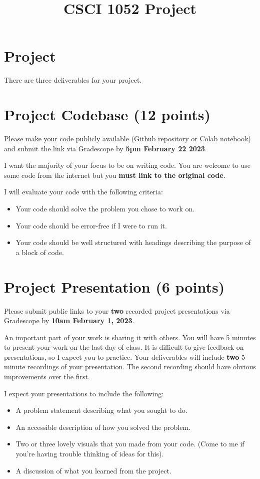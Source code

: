 \documentclass{article}
\title{CSCI 1052 Project}
\date{}
\begin{document}
\maketitle

\section*{Project}

There are three deliverables for your project.

\section{Project Codebase (12 points)}
Please make your code publicly available (Github repository
or Colab notebook) and submit the link via Gradescope by
\textbf{5pm February 22 2023}.

I want the majority of your focus to be on writing code.
You are welcome to use some code from the internet but you
\textbf{must link to the original code}.

I will evaluate your code with the following criteria:
\begin{itemize}
    \item Your code should solve the problem you chose to work on.
    \item Your code should be error-free if I were to run it.
    \item Your code should be well structured with headings describing 
    the purpose of a block of code.
\end{itemize}

\section{Project Presentation (6 points)}
Please submit public links to your \textbf{two} recorded
project presentations via Gradescope by \textbf{10am February 1, 2023}.

An important part of your work is sharing it with others.
You will have 5 minutes to present your work on the last day of class.
It is difficult to give feedback on presentations, so I expect you to practice.
Your deliverables will include \textbf{two} 5 minute recordings
of your presentation.
The second recording should have obvious improvements over the first.

I expect your presentations to include the following:
\begin{itemize}
    \item A problem statement describing what you sought to do.
    \item An accessible description of how you solved the problem.
    \item Two or three lovely visuals that you made from your code.
    (Come to me if you're having trouble thinking of ideas for this).
    \item A discussion of what you learned from the project.
\end{itemize}
\end{document}
